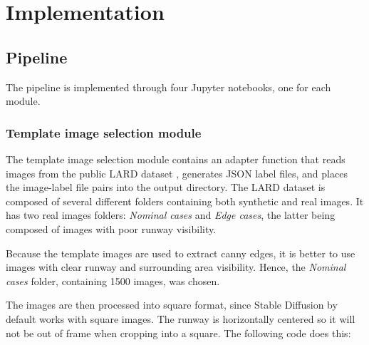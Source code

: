 \chapter{Implementation}




% 


\section{Pipeline}

The pipeline is implemented through four Jupyter notebooks, one for each module.

\subsection{Template image selection module}

The template image selection module contains an adapter function that reads images from the public LARD dataset \cite{ducoffe_lard_2023}, generates JSON label files, and places the image-label file pairs into the output directory. 
The LARD dataset is composed of several different folders containing both synthetic and real images. 
It has two real images folders: \emph{Nominal cases} and \emph{Edge cases}, the latter being composed of images with poor runway visibility.

Because the template images are used to extract canny edges, it is better to use images with clear runway and surrounding area visibility. 
Hence, the \emph{Nominal cases} folder, containing 1500 images, was chosen.

The images are then processed into square format, since Stable Diffusion by
default works with square images. 
The runway is horizontally centered so it will not be out of frame when cropping into a square. 
The following code does this:

